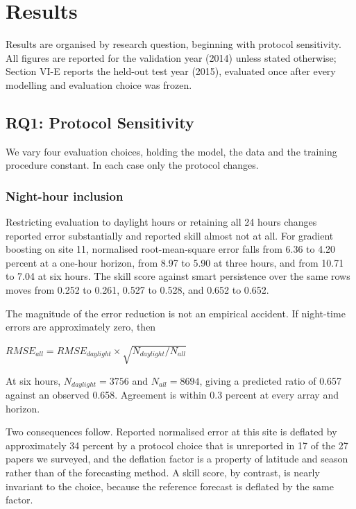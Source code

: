 \section{Results}
\label{sec:results}

Results are organised by research question, beginning with protocol
sensitivity. All figures are reported for the validation year (2014)
unless stated otherwise; Section VI-E reports the held-out test year
(2015), evaluated once after every modelling and evaluation choice was
frozen.

\subsection{RQ1: Protocol Sensitivity}
\label{sec:rq1}

We vary four evaluation choices, holding the model, the data and the
training procedure constant. In each case only the protocol changes.



\subsubsection{Night-hour inclusion}

Restricting evaluation to daylight hours or retaining all 24 hours
changes reported error substantially and reported skill almost not at
all. For gradient boosting on site 11, normalised root-mean-square error
falls from 6.36 to 4.20 percent at a one-hour horizon, from 8.97 to 5.90
at three hours, and from 10.71 to 7.04 at six hours. The skill score
against smart persistence over the same rows moves from 0.252 to 0.261,
0.527 to 0.528, and 0.652 to 0.652.

The magnitude of the error reduction is not an empirical accident. If
night-time errors are approximately zero, then

  $RMSE_{all} = RMSE_{daylight} \times \sqrt{N_{daylight} / N_{all}}$

At six hours, $N_{daylight} = 3756$ and $N_{all} = 8694$, giving a predicted
ratio of 0.657 against an observed 0.658. Agreement is within 0.3
percent at every array and horizon.

Two consequences follow. Reported normalised error at this site is
deflated by approximately 34 percent by a protocol choice that is
unreported in 17 of the 27 papers we surveyed, and the deflation factor
is a property of latitude and season rather than of the forecasting
method. A skill score, by contrast, is nearly invariant to the choice,
because the reference forecast is deflated by the same factor.

